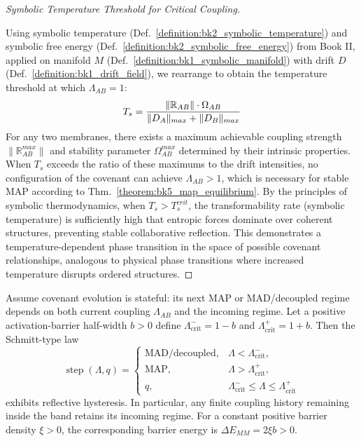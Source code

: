 \begin{proof}[Symbolic Temperature Threshold for Critical Coupling]
\label{proof:bk5_symbolic_temperature_threshold}
\leavevmode

Using symbolic temperature
(Def.~\ref{definition:bk2_symbolic_temperature}) and symbolic free energy
(Def.~\ref{definition:bk2_symbolic_free_energy}) from Book II, applied on
manifold $M$ (Def.~\ref{definition:bk1_symbolic_manifold}) with drift $D$
(Def.~\ref{definition:bk1_drift_field}), we rearrange to obtain the
temperature threshold at which $\Lambda_{AB} = 1$:
\begin{equation}
T_s = \frac{\|\mathbb{R}_{AB}\| \cdot \Omega_{AB}}{\|D_A\|_{max} + \|D_B\|_{max}}
\end{equation}
For any two membranes, there exists a maximum achievable coupling strength $\|\mathbb{R}_{AB}^{max}\|$ and stability parameter $\Omega_{AB}^{max}$ determined by their intrinsic properties. When $T_s$ exceeds the ratio of these maximums to the drift intensities, no configuration of the covenant can achieve $\Lambda_{AB} > 1$, which is necessary for stable MAP according to Thm.~\ref{theorem:bk5_map_equilibrium}.
By the principles of symbolic thermodynamics, when $T_s > T_s^{crit}$, the transformability rate (symbolic temperature) is sufficiently high that entropic forces dominate over coherent structures, preventing stable collaborative reflection. 
This demonstrates a temperature-dependent phase transition in the space of possible covenant relationships, analogous to physical phase transitions where increased temperature disrupts ordered structures.
\end{proof}
\begin{corollary} \label{corollary:bk5_reflective_hysteresis}
Assume covenant evolution is stateful: its next MAP or MAD/decoupled regime
depends on both current coupling $\Lambda_{AB}$ and the incoming regime.  Let a
positive activation-barrier half-width $b>0$ define
$\Lambda^-_{\mathrm{crit}}=1-b$ and
$\Lambda^+_{\mathrm{crit}}=1+b$.  Then the Schmitt-type law
\[
\operatorname{step}(\Lambda,q)=
\begin{cases}
\mathrm{MAD/decoupled},&\Lambda<\Lambda^-_{\mathrm{crit}},\\
\mathrm{MAP},&\Lambda>\Lambda^+_{\mathrm{crit}},\\
q,&\Lambda^-_{\mathrm{crit}}\leq\Lambda\leq\Lambda^+_{\mathrm{crit}}
\end{cases}
\]
exhibits reflective hysteresis.  In particular, any finite coupling history
remaining inside the band retains its incoming regime.  For a constant positive
barrier density $\xi>0$, the corresponding barrier energy is
$\Delta E_{MM}=2\xi b>0$.
\end{corollary}
